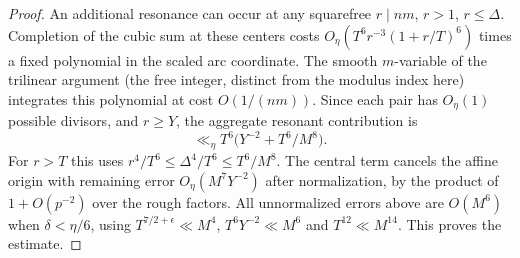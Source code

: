 \documentclass[11pt,letterpaper]{article}
\theoremstyle{definition}
\begin{document}
\begin{proof}
An additional resonance can occur at any squarefree $r\mid nm$,
$r>1$, $r\le\Delta$. Completion of the cubic sum at these
centers costs $O_\eta(T^6 r^{-3}(1+r/T)^6)$ times a fixed
polynomial in the scaled arc coordinate. The smooth $m$-variable
of the trilinear argument (the free integer, distinct from the
modulus index here) integrates this polynomial at cost
$O(1/(nm))$. Since each pair has $O_\eta(1)$ possible divisors,
and $r\ge Y$, the aggregate resonant contribution is
\[
 \ll_\eta T^6\big(Y^{-2}+T^6/M^8\big).
\]
For $r>T$ this uses $r^4/T^6\le\Delta^4/T^6\le T^6/M^8$.
The central term cancels the affine origin with remaining error
$O_\eta(M^7Y^{-2})$ after normalization, by the product of
$1+O(p^{-2})$ over the rough factors. All unnormalized errors
above are $O(M^6)$ when $\delta<\eta/6$, using
$T^{7/2+\epsilon}\ll M^4$, $T^6Y^{-2}\ll M^6$ and
$T^{12}\ll M^{14}$. This proves the estimate.
\end{proof}
\end{document}
